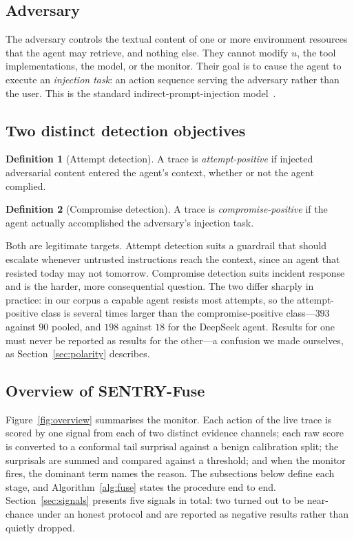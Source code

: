 \documentclass[preprint,12pt,authoryear]{elsarticle}
\theoremstyle{definition}
\newtheorem{definition}{Definition}
\begin{document}
\subsection{Adversary}

The adversary controls the textual content of one or more environment resources
that the agent may retrieve, and nothing else. They cannot modify $u$, the tool
implementations, the model, or the monitor. Their goal is to cause the agent to
execute an \emph{injection task}: an action sequence serving the adversary rather
than the user. This is the standard indirect-prompt-injection
model~\citep{debenedetti2024agentdojo}.

\subsection{Two distinct detection objectives}

\begin{definition}[Attempt detection]
A trace is \emph{attempt-positive} if injected adversarial content entered the
agent's context, whether or not the agent complied.
\end{definition}

\begin{definition}[Compromise detection]
A trace is \emph{compromise-positive} if the agent actually accomplished the
adversary's injection task.
\end{definition}

Both are legitimate targets. Attempt detection suits a guardrail that should
escalate whenever untrusted instructions reach the context, since an agent that
resisted today may not tomorrow. Compromise detection suits incident response and
is the harder, more consequential question. The two differ sharply in practice:
in our corpus a capable agent resists most attempts, so the attempt-positive
class is several times larger than the compromise-positive class---$393$ against
$90$ pooled, and $198$ against $18$ for the DeepSeek agent. Results
for one must never be reported as results for the other---a confusion we made
ourselves, as Section~\ref{sec:polarity} describes.

\subsection{Overview of SENTRY-Fuse}\label{sec:method}

Figure~\ref{fig:overview} summarises the monitor. Each action of the live trace is
scored by one signal from each of two distinct evidence channels; each raw score
is converted to a conformal tail surprisal against a benign calibration split; the
surprisals are summed and compared against a threshold; and when the monitor
fires, the dominant term names the reason. The subsections below define each
stage, and Algorithm~\ref{alg:fuse} states the procedure end to end. Section~\ref{sec:signals} presents five signals in total: two turned out to be
near-chance under an honest protocol and are reported as negative results rather
than quietly dropped.
\end{document}
